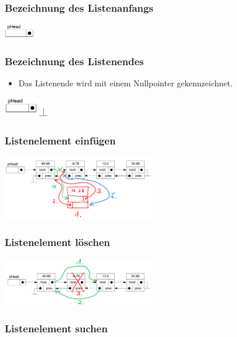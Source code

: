 \subsubsection{Bezeichnung des Listenanfangs}
\begin{flushleft}
  {\includegraphics[width=0.1\textwidth]{images/Listen/SLL_Anfang.jpg}}
  \label{Fig: Single Linked List}
\end{flushleft}


\subsubsection{Bezeichnung des Listenendes}
\begin{itemize}
  \item Das Listenende wird mit einem Nullpointer gekennzeichnet.
\end{itemize}
\begin{flushleft}
  {\includegraphics[width=0.15\textwidth]{images/Listen/SLL_Ende.jpg}}
  \label{Fig: Single Linked List}
\end{flushleft}

\subsubsection{Listenelement einfügen}
\begin{flushleft}
{\includegraphics[width=0.5\textwidth]{images/Listen/DLL_Insert.png}}
\label{Fig: Element bei DLL einf"ugen}
\end{flushleft}


\subsubsection{Listenelement löschen}
\begin{flushleft}
{\includegraphics[width=0.5\textwidth]{images/Listen/DLL_Delete.png}}
\label{Fig: Element bei DLL l"oschen}
\end{flushleft}


\subsubsection{Listenelement suchen}
